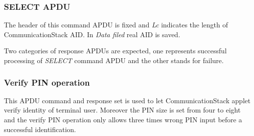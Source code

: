 \subsubsection{SELECT APDU}
The header of this command APDU is fixed and \emph{Lc} indicates the length of CommunicationStack AID. In \emph{Data filed} real AID is saved.
\begin{table}[!htbp]
\caption{SELECT command APDU}
\label{select-apdu}
\end{table}
Two categories of response APDUs are expected, one represents successful processing of \emph{SELECT} command APDU and the other stands for failure.
\begin{table}[!htbp]
\caption{SELECT response APDU}
\label{select-response-apdu}
\end{table}

\subsubsection{Verify PIN operation}
This APDU command and response set is used to let CommunicationStack applet verify identity of terminal user. Moreover the PIN size is set from four to eight and the verify PIN operation only allows three times wrong PIN input before a successful identification.

\begin{table}[!htbp]
\caption{Verify PIN command }
\label{verify-command-apdu}
\end{table}


